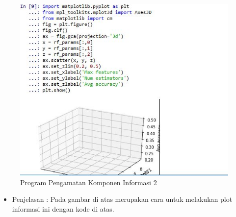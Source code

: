 \begin{enumerate}
\begin{itemize}
\begin{itemize}
\begin{itemize}
\begin{figure}[ht]
\centering
\includegraphics[scale=0.7]{figures/hmm/cod30.jpg}
\caption{Program Pengamatan Komponen Informasi 2}
\label{contoh}
\end{figure}
\par
\begin{itemize}
\item Penjelasan : Pada gambar di atas merupakan cara untuk  melakukan plot informasi ini dengan kode di atas.
\par 
\par
\end{itemize}
\end{itemize}
\end{itemize}
\end{itemize}


\end{enumerate}

